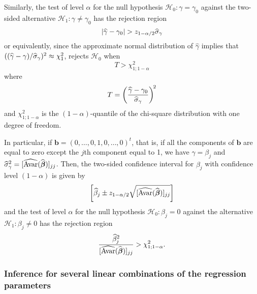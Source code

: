 Similarly, the test of level $\alpha$ for the null hypothesis $\mathcal{H}_0:
\gamma = \gamma_0$ against the two-sided alternative $\mathcal{H}_1: \gamma
\neq \gamma_0$ has the rejection region
\[
    |\widehat{\gamma}-\gamma_0| > z_{1-\alpha/2}\widehat{\sigma}_\gamma
\]
or equivalently, since the approximate normal distribution of
$\widehat{\gamma}$ implies that
$((\widehat{\gamma}-\gamma)/\widehat{\sigma}_\gamma)^2 \approx \chi_1^2$, rejects
$\mathcal{H}_0$ when
\[
    T > \chi_{1; 1-\alpha}^2
\]
where
\[
    T = \left(\frac{\sthat{\gamma}-\gamma_0}{\sthat{\sigma}_\gamma}\right)^{\!2}
\]
and $\chi_{1;1-\alpha}^2$ is the $(1-\alpha)$-quantile of the chi-square
distribution with one degree of freedom.

In particular, if $\mathbf{b} = (0, \dots, 0, 1, 0, \dots, 0)^t$, that is, if
all the components of $\mathbf{b}$ are equal to zero except the $j$th component
equal to 1, we have $\gamma = \beta_j$ and $\widehat{\sigma}_\gamma^2 =
[\widehat{\mathrm{Avar}}(\widehat{\boldsymbol\beta})]_{jj}$. Then, the two-sided
confidence interval for $\beta_j$ with confidence level $(1-\alpha)$ is given by
\[
    \left[\sthat{\beta}_j \pm 
    z_{1-\alpha/2} \sqrt{[\sthat{\mathrm{Avar}}(\sthat{\boldsymbol\beta})]_{jj}}\right]
\]
and the test of level $\alpha$ for the null hypothesis $\mathcal{H}_0: \beta_j =
0$ against the alternative $\mathcal{H}_1: \beta_j \neq 0$ has the rejection
region
\[
    \frac{\widehat{\beta}_j^2}{[\widehat{\mathrm{Avar}}(\widehat{\boldsymbol\beta})]_{jj}} 
    > \chi_{1;1-\alpha}^2.
\]

\subsubsection{Inference for several linear combinations of the regression parameters}

